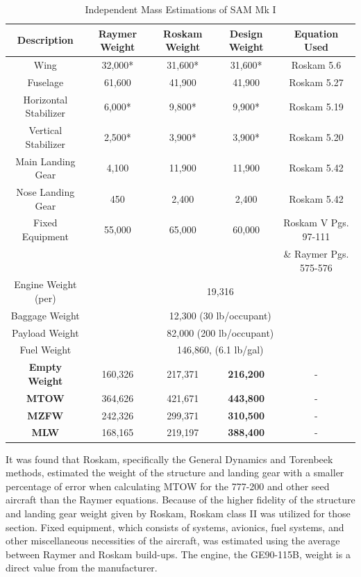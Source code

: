 \begin{table}[!h]
\centering
\caption{Independent Mass Estimations of SAM Mk I}
\begin{tabular}{|c||c|c|c|c| }
\toprule
\multicolumn{1}{|c||}{\textbf{Description}} & \multicolumn{1}{c|}{\textbf{Raymer Weight}} &  
 \textbf{Roskam Weight} & \textbf{Design Weight} & \textbf{Equation Used} \\ \hline \hline 
Wing & 32,000* & 31,600* & 31,600* & Roskam 5.6  \cite{roskam_5} \\ \hline
Fuselage & 61,600 & 41,900 & 41,900 & Roskam 5.27  \cite{roskam_5} \\ \hline
Horizontal Stabilizer & 6,000* & 9,800* & 9,900* & Roskam 5.19 \cite{roskam_5} \\ \hline
Vertical Stabilizer & 2,500* & 3,900* & 3,900* & Roskam 5.20 \cite{roskam_5} \\ \hline
Main Landing Gear & 4,100 & 11,900 & 11,900 & Roskam 5.42  \cite{roskam_5} \\ \hline
Nose Landing Gear & 450 &2,400 & 2,400 & Roskam 5.42  \cite{roskam_5} \\ \hline
Fixed Equipment & 55,000 & 65,000 & 60,000 & Roskam V Pgs. 97-111 \cite{roskam_5}  \\
& & & & \& Raymer Pgs. 575-576 \cite{raymer} \\ \hline
Engine Weight (per) &  \multicolumn{4}{|c|}{19,316}   \\ \hline
Baggage Weight & \multicolumn{4}{|c|}{12,300 (30 lb/occupant) }  \\ \hline
Payload Weight & \multicolumn{4}{|c|}{82,000 (200 lb/occupant) }  \\ \hline
Fuel Weight & \multicolumn{4}{|c|}{146,860, (6.1 lb/gal) }  \\ \hline \hline
\textbf{Empty Weight} & 160,326 & 217,371 & \textbf{216,200} & -\\ \hline
\textbf{MTOW} & 364,626 & 421,671 & \textbf{443,800}  & - \\ \hline
\textbf{MZFW} & 242,326 & 299,371 & \textbf{310,500}  & - \\ \hline
\textbf{MLW} & 168,165 & 219,197 & \textbf{388,400} & - \\
\bottomrule
\end{tabular}
\label{tab:mass_props}
\end{table}
\FloatBarrier

It was found that Roskam, specifically the General Dynamics and Torenbeek methods, estimated the weight of the structure and landing gear with a smaller percentage of error when calculating MTOW for the 777-200 and other seed aircraft than the Raymer equations. Because of the higher fidelity of the structure and landing gear weight given by Roskam, Roskam class II was utilized for those section. Fixed equipment, which consists of systems, avionics, fuel systems, and other miscellaneous necessities of the aircraft, was estimated using the average between Raymer and Roskam build-ups. The engine, the GE90-115B, weight is a direct value from the manufacturer.\cite{roskam_5}\cite{raymer}

